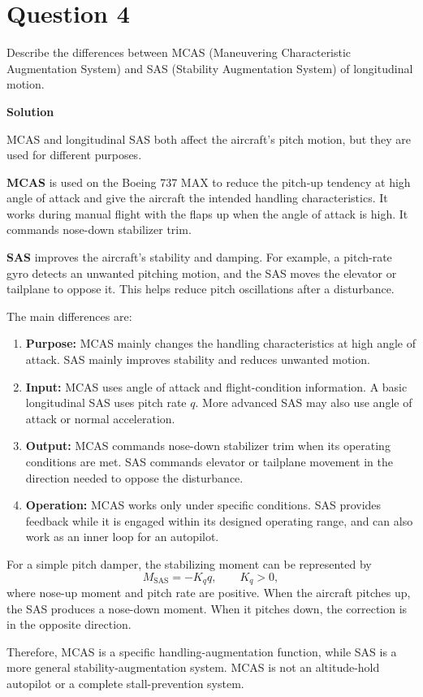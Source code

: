 \documentclass[12pt,a4paper]{article}
\begin{document}
\section*{Question 4}
Describe the differences between MCAS (Maneuvering Characteristic Augmentation System) and SAS (Stability Augmentation System) of longitudinal motion.

\textbf{Solution}

MCAS and longitudinal SAS both affect the aircraft's pitch motion, but they are used for different purposes.

\textbf{MCAS} is used on the Boeing 737 MAX to reduce the pitch-up tendency at high angle of attack and give the aircraft the intended handling characteristics. It works during manual flight with the flaps up when the angle of attack is high. It commands nose-down stabilizer trim.

\textbf{SAS} improves the aircraft's stability and damping. For example, a pitch-rate gyro detects an unwanted pitching motion, and the SAS moves the elevator or tailplane to oppose it. This helps reduce pitch oscillations after a disturbance.

The main differences are:
\begin{enumerate}
\item \textbf{Purpose:} MCAS mainly changes the handling characteristics at high angle of attack. SAS mainly improves stability and reduces unwanted motion.
\item \textbf{Input:} MCAS uses angle of attack and flight-condition information. A basic longitudinal SAS uses pitch rate $q$. More advanced SAS may also use angle of attack or normal acceleration.
\item \textbf{Output:} MCAS commands nose-down stabilizer trim when its operating conditions are met. SAS commands elevator or tailplane movement in the direction needed to oppose the disturbance.
\item \textbf{Operation:} MCAS works only under specific conditions. SAS provides feedback while it is engaged within its designed operating range, and can also work as an inner loop for an autopilot.
\end{enumerate}
For a simple pitch damper, the stabilizing moment can be represented by
\[
M_{\mathrm{SAS}}=-K_q q,\qquad K_q>0,
\]
where nose-up moment and pitch rate are positive. When the aircraft pitches up, the SAS produces a nose-down moment. When it pitches down, the correction is in the opposite direction.

Therefore, MCAS is a specific handling-augmentation function, while SAS is a more general stability-augmentation system. MCAS is not an altitude-hold autopilot or a complete stall-prevention system.
\newpage
\end{document}
